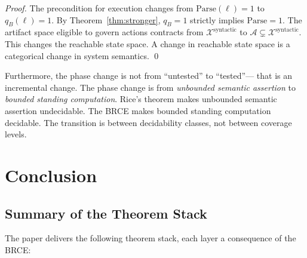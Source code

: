 \documentclass[12pt, letterpaper]{report}
\theoremstyle{plain}
\theoremstyle{definition}
\theoremstyle{remark}
\begin{document}
\begin{proof}
The precondition for execution changes from $\mathrm{Parse}(\ell) = 1$
to $q_B(\ell) = 1$.
By Theorem~\ref{thm:stronger}, $q_B = 1$ strictly implies $\mathrm{Parse} = 1$.
The artifact space eligible to govern actions contracts from
$\mathcal{X}^{\mathrm{syntactic}}$ to $\mathcal{A} \subsetneq \mathcal{X}^{\mathrm{syntactic}}$.
This changes the reachable state space. A change in reachable state space
is a categorical change in system semantics. \qed
\end{proof}

Furthermore, the phase change is not from ``untested'' to ``tested''---
that is an incremental change.
The phase change is from \emph{unbounded semantic assertion} to
\emph{bounded standing computation}.
Rice's theorem makes unbounded semantic assertion undecidable.
The BRCE makes bounded standing computation decidable.
The transition is between decidability classes, not between coverage levels.

\chapter{Conclusion}
\label{ch:conclusion}

\section{Summary of the Theorem Stack}

The paper delivers the following theorem stack, each layer a consequence
of the BRCE:
\end{document}
